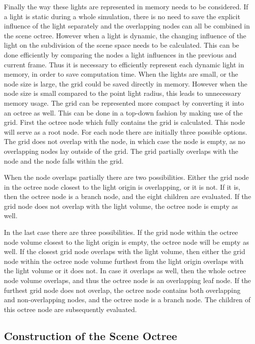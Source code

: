 Finally the way these lights are represented in memory needs to be considered. If a light is
static during a whole simulation, there is no need to save the explicit influence of the
light separately and the overlapping nodes can all be combined in the scene octree.
However when a light is dynamic, the changing influence of the light on the subdivision of
the scene space needs to be calculated. This can be done efficiently by comparing the nodes
a light influences in the previous and current frame. Thus it is necessary to efficiently
represent each dynamic light in memory, in order to save computation time.
When the lights are small, or the node size is large, the grid could be saved directly in
memory. However when the node size is small compared to the point light radius, this leads
to unnecessary memory usage. The grid can be represented more compact by converting it into
an octree as well. This can be done in a top-down fashion by making use of the grid.
First the octree node which fully contains the grid is calculated. This node will serve
as a root node. For each node there are initially three possible options. The grid
does not overlap with the node, in which case the node is empty, as no overlapping nodes
lay outside of the grid. The grid partially overlaps with the node and the node falls
within the grid.

When the node overlaps partially there are two possibilities. Either the grid node
in the octree node closest to the light origin is overlapping, or it is not.
If it is, then the octree node is a branch node, and the eight children are evaluated.
If the grid node does not overlap with the light volume, the octree node is empty
as well.

In the last case there are three possibilities. If the grid node within the octree
node volume closest to the light origin is empty, the octree node will be empty
as well. If the closest grid node overlaps with the light volume, then either
the grid node within the octree node volume furthest from the light origin overlaps
with the light volume or it does not. In case it overlaps as well, then the whole
octree node volume overlaps, and thus the octree node is an overlapping leaf node.
If the furthest grid node does not overlap, the octree node contains both overlapping
and non-overlapping nodes, and the octree node is a branch node. The children of
this octree node are subsequently evaluated.

\subsection{Construction of the Scene Octree}

